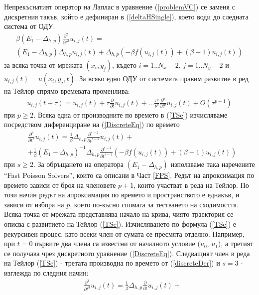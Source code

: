 \documentclass[a4paper]{article}
\newcommand{\rf}[1]{(\ref{#1})}
\theoremstyle{remark}
\begin{document}
\begin{large}
Непрекъснатият оператор на Лаплас в уравнение \rf{problemVC} се заменя с дискретния такъв, който е дефиниран в \rf{deltaHSingle}, което води до следната система от ОДУ:
\begin{align} \label{DiscreteEq}
\beta (E_1-\Delta_{h,p}) \frac{\partial^2 }{\partial t^2}u_{i, j}(t)= \nonumber \\
 (E_1 - \Delta_{h,p})\Delta_{h,p} u_{i, j}(t) + \Delta_{h,p} ( -\beta f( u_{i, j}(t) ) + (\beta-1) u_{i, j}(t) )
\end{align}
за всяка точка от мрежата $(x_i, y_j)$, където $i = 1..N_x-2$, $j=1..N_y-2$ и $u_{i, j}(t) = u(x_i, y_j, t)$. За всяко едно ОДУ от системата правим развитие в ред на Тейлор спрямо времевата променлива:
\begin{align} \label{TSe}
u_{i, j}(t+\tau) = u_{i, j}(t) + \tau \frac{ \partial }{ \partial t }u_{i, j}(t)  + ... 
\frac{ \tau^p }{ p! } \frac{ \partial^p}{ \partial t^p }u_{i, j}(t) + O(\tau^{p+1})
\end{align}
при $p \ge 2$. Всяка една от производните по времето в \rf{TSe} изчисляваме посредством диференциране на \rf{DiscreteEq} по времето
\begin{align}\label{discreteDer}
&\frac{\partial^s}{\partial t^s}u_{i, j}(t)= \frac{1}{\beta} \Delta_{h,p} \frac{\partial^{s-2}}{\partial t^{s-2}} u_{i, j}(t) + \nonumber \\ 
&+\frac{1}{\beta} (E_1-\Delta_{h,p})^{-1} \Delta_{h,p} \frac{\partial^{s-2}}{\partial t^{s-2}} ( -\beta f( u_{i, j}(t) ) + (\beta-1) u_{i, j}(t) ) 
\end{align}
при $s \ge 2$. За обръщането на оператора $(E_1-\Delta_{h,p})$ използваме така наречените ``Fast Poisson Solvers'', които са описани в Част \ref{FPS}. Редът на апроксимация по времето зависи от броя на членовете $p+1$, които участват в реда на Тейлор. По този начин редът на апроксимация по времето и пространството е еднакъв, и зависи от избора на $p$, което по-късно спомага за тестването на сходимостта. Всяка точка от мрежата представлява начало на крива, чиято траектория се описва с развитието на Тейлор \rf{TSe}. Изчисляването по формула \rf{TSe} е рекурсивен процес, като всеки член от сумата се пресмята отделно. Например, при $t=0$ първите два члена са известни от началното условие ($u_0$, $u_1$), а третият се получава чрез дискретното уравнение \rf{DiscreteEq}.  Следващият член в реда на Тейлор \rf{TSe} - третата производна по времето от \rf{discreteDer} и $s=3$ - изглежда по следния начин:
\begin{align} \label{der3}
 &\frac{\partial^3}{\partial t^3}u_{i,j}(t) = \frac{1}{\beta}\Delta_{h,p} \frac{\partial}{\partial t}u_{i, j}(t) + \nonumber\\

\end{align}
\end{large}
\end{document}
